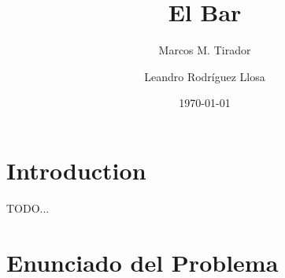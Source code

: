 \documentclass[10pt]{amsart}
\theoremstyle{definition}
\numberwithin{equation}{section}
\begin{document}
	
	\mbox{}
	\title{El Bar}
	
	\author{Marcos M. Tirador}
	\address{Facultad de Matem\'atica y Computaci\'on \\ Universidad de La Habana \\ Ciudad de La Habana \\ Cuba}
	
	
	\author{Leandro Rodr\'iguez Llosa}
	\address{Facultad de Matem\'atica y Computaci\'on \\ Universidad de La Habana \\ Ciudad de La Habana \\ Cuba}
		

\date{\today}


\bigskip
\maketitle


\bigskip
\section{Introduction}
\label{sec:intro}

TODO...


\section{Enunciado del Problema}
	
\end{document}
